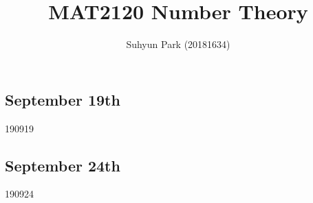 



\title{MAT2120 Number Theory}
\author{Suhyun Park (20181634)}

\subsection{September 19th}
{190919}

\subsection{September 24th}
{190924}



